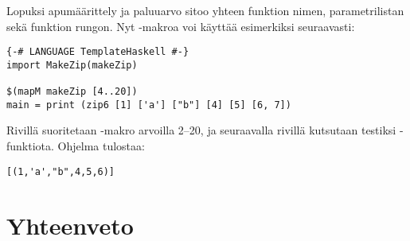 Lopuksi apumäärittely  ja paluuarvo  sitoo yhteen
funktion nimen, parametrilistan sekä funktion rungon.
Nyt -makroa voi käyttää esimerkiksi seuraavasti:
\begin{verbatim}
{-# LANGUAGE TemplateHaskell #-}
import MakeZip(makeZip)

$(mapM makeZip [4..20])
main = print (zip6 [1] ['a'] ["b"] [4] [5] [6, 7])
\end{verbatim}
Rivillä  suoritetaan -makro arvoilla 2--20,
ja seuraavalla rivillä kutsutaan testiksi -funktiota.
Ohjelma tulostaa:
\begin{verbatim}
[(1,'a',"b",4,5,6)]
\end{verbatim}

\section{Yhteenveto}
